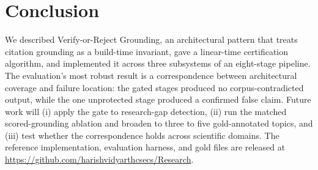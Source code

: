 \documentclass[conference]{IEEEtran}
\begin{document}
\section{Conclusion}
We described Verify-or-Reject Grounding, an architectural pattern that treats
citation grounding as a build-time invariant, gave a linear-time certification
algorithm, and implemented it across three subsystems of an eight-stage pipeline.
The evaluation's most robust result is a correspondence between architectural
coverage and failure location: the gated stages produced no corpus-contradicted
output, while the one unprotected stage produced a confirmed false claim.
Future work will (i) apply the gate to research-gap detection, (ii) run the
matched scored-grounding ablation and broaden to three to five gold-annotated
topics, and (iii) test whether the correspondence holds across scientific
domains. The reference implementation, evaluation harness, and gold files are
released at \url{https://github.com/harishvidyarthcsecs/Research}.



\end{document}
